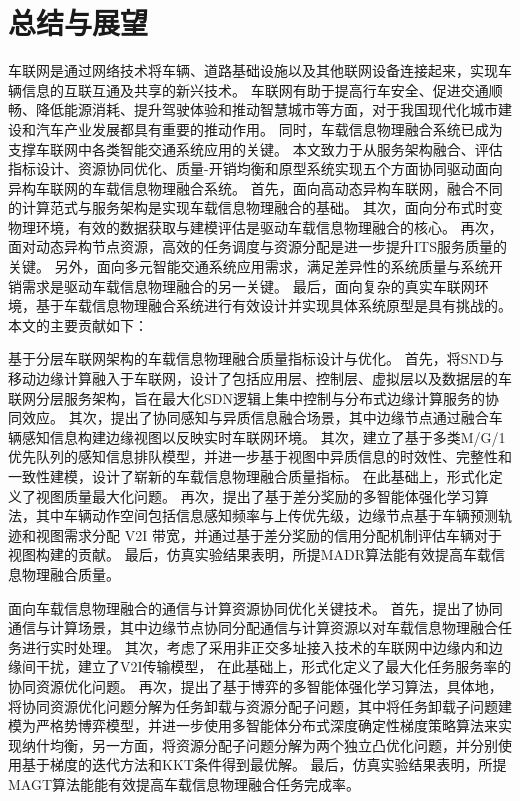 \chapter{总结与展望}\label{section 6}

车联网是通过网络技术将车辆、道路基础设施以及其他联网设备连接起来，实现车辆信息的互联互通及共享的新兴技术。
车联网有助于提高行车安全、促进交通顺畅、降低能源消耗、提升驾驶体验和推动智慧城市等方面，对于我国现代化城市建设和汽车产业发展都具有重要的推动作用。
同时，车载信息物理融合系统已成为支撑车联网中各类智能交通系统应用的关键。
本文致力于从服务架构融合、评估指标设计、资源协同优化、质量-开销均衡和原型系统实现五个方面协同驱动面向异构车联网的车载信息物理融合系统。
首先，面向高动态异构车联网，融合不同的计算范式与服务架构是实现车载信息物理融合的基础。
其次，面向分布式时变物理环境，有效的数据获取与建模评估是驱动车载信息物理融合的核心。
再次，面对动态异构节点资源，高效的任务调度与资源分配是进一步提升ITS服务质量的关键。
另外，面向多元智能交通系统应用需求，满足差异性的系统质量与系统开销需求是驱动车载信息物理融合的另一关键。
最后，面向复杂的真实车联网环境，基于车载信息物理融合系统进行有效设计并实现具体系统原型是具有挑战的。
本文的主要贡献如下：

 基于分层车联网架构的车载信息物理融合质量指标设计与优化。
首先，将SND与移动边缘计算融入于车联网，设计了包括应用层、控制层、虚拟层以及数据层的车联网分层服务架构，旨在最大化SDN逻辑上集中控制与分布式边缘计算服务的协同效应。
其次，提出了协同感知与异质信息融合场景，其中边缘节点通过融合车辆感知信息构建边缘视图以反映实时车联网环境。
其次，建立了基于多类M/G/1优先队列的感知信息排队模型，并进一步基于视图中异质信息的时效性、完整性和一致性建模，设计了崭新的车载信息物理融合质量指标。
在此基础上，形式化定义了视图质量最大化问题。
再次，提出了基于差分奖励的多智能体强化学习算法，其中车辆动作空间包括信息感知频率与上传优先级，边缘节点基于车辆预测轨迹和视图需求分配 V2I 带宽，并通过基于差分奖励的信用分配机制评估车辆对于视图构建的贡献。
最后，仿真实验结果表明，所提MADR算法能有效提高车载信息物理融合质量。

 面向车载信息物理融合的通信与计算资源协同优化关键技术。
首先，提出了协同通信与计算场景，其中边缘节点协同分配通信与计算资源以对车载信息物理融合任务进行实时处理。
其次，考虑了采用非正交多址接入技术的车联网中边缘内和边缘间干扰，建立了V2I传输模型，
在此基础上，形式化定义了最大化任务服务率的协同资源优化问题。
再次，提出了基于博弈的多智能体强化学习算法，具体地，将协同资源优化问题分解为任务卸载与资源分配子问题，其中将任务卸载子问题建模为严格势博弈模型，并进一步使用多智能体分布式深度确定性梯度策略算法来实现纳什均衡，另一方面，将资源分配子问题分解为两个独立凸优化问题，并分别使用基于梯度的迭代方法和KKT条件得到最优解。
最后，仿真实验结果表明，所提MAGT算法能能有效提高车载信息物理融合任务完成率。

